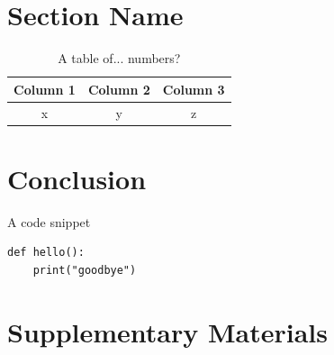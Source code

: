 \documentclass[a4paper,11pt]{article}
\begin{document}
\section{Section Name}

\begin{table}[h!]
    \centering
    \caption{A table of... numbers?}
    \label{tab:numbers?}
    \begin{tabular}{ccc}
        \toprule
        Column 1 & Column 2 & Column 3 \\ \midrule
        x & y & z \\
        \bottomrule
    \end{tabular}
\end{table}

\section{Conclusion}
\begin{listing}[h!]
    \caption{A code snippet}
    \label{code:bye}
    \begin{verbatim}
def hello():
    print("goodbye")
    \end{verbatim}
\end{listing}

\pagebreak
\printbibliography


\pagebreak
\appendix

\section{Supplementary Materials}

\end{document}
